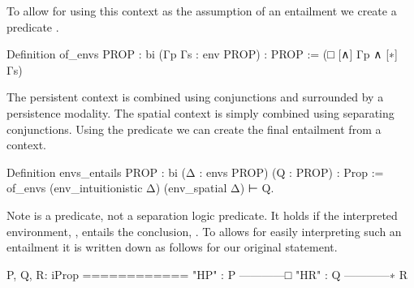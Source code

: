 \documentclass[thesis.tex]{subfiles}
\begin{document}
{To allow for using this context as the assumption of an entailment we create a predicate .
\begin{coqcode}
  Definition of_envs {PROP : bi} 
      (Γp Γs : env PROP) : PROP :=
    (□ [∧] Γp ∧ [∗] Γs)%
\end{coqcode}
The persistent context is combined using conjunctions and surrounded by a persistence modality. The spatial context is simply combined using separating conjunctions. Using the predicate we can create the final entailment from a context.
\begin{coqcode}
  Definition envs_entails {PROP : bi} 
      (Δ : envs PROP) (Q : PROP) : Prop :=
    of_envs (env_intuitionistic Δ) (env_spatial Δ) ⊢ Q.
\end{coqcode}
Note  is a \coq predicate, not a separation logic predicate. It holds if the interpreted environment, , entails the conclusion, . To allows for easily interpreting such an entailment it is written down as follows for our original statement.
\begin{coqcode}
  P, Q, R: iProp
  ============
  "HP" : P
  ------------□
  "HR" : Q
  ------------∗
  R
\end{coqcode}

}
\end{document}
